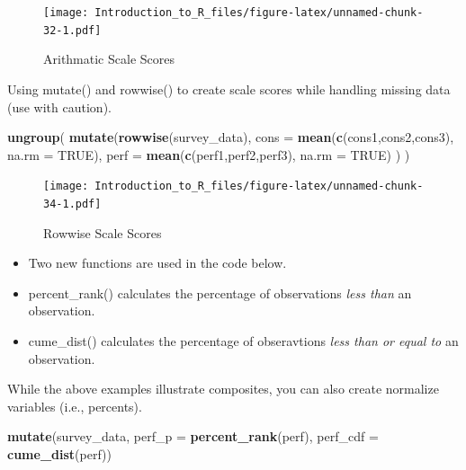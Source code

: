 \documentclass[]{book}
\newenvironment{Shaded}{\begin{snugshade}}{\end{snugshade}}
\newcommand{\DataTypeTok}[1]{\textcolor[rgb]{0.13,0.29,0.53}{#1}}
\newcommand{\KeywordTok}[1]{\textcolor[rgb]{0.13,0.29,0.53}{\textbf{#1}}}
\newcommand{\NormalTok}[1]{#1}
\newcommand{\OtherTok}[1]{\textcolor[rgb]{0.56,0.35,0.01}{#1}}
\providecommand{\tightlist}{%
  \setlength{\itemsep}{0pt}\setlength{\parskip}{0pt}}
\theoremstyle{definition}
\theoremstyle{definition}
\theoremstyle{definition}
\theoremstyle{remark}
\let\BeginKnitrBlock\begin \let\EndKnitrBlock\end
\begin{document}
\begin{figure}
\centering
\texttt{[image: Introduction\_to\_R\_files/figure-latex/unnamed-chunk-32-1.pdf]}
\caption{\label{fig:unnamed-chunk-32}Arithmatic Scale Scores}
\end{figure}

\BeginKnitrBlock{example}
\protect\hypertarget{exm:mutate2}{}{\label{exm:mutate2} }Using mutate() and rowwise() to create scale scores while handling missing data (use with caution).
\EndKnitrBlock{example}

\begin{Shaded}
\begin{Highlighting}[]
\KeywordTok{ungroup}\NormalTok{(}
  \KeywordTok{mutate}\NormalTok{(}\KeywordTok{rowwise}\NormalTok{(survey_data),}
         \DataTypeTok{cons =} \KeywordTok{mean}\NormalTok{(}\KeywordTok{c}\NormalTok{(cons1,cons2,cons3),}
                     \DataTypeTok{na.rm =} \OtherTok{TRUE}\NormalTok{), }
         \DataTypeTok{perf =} \KeywordTok{mean}\NormalTok{(}\KeywordTok{c}\NormalTok{(perf1,perf2,perf3), }
                     \DataTypeTok{na.rm =} \OtherTok{TRUE}\NormalTok{)}
\NormalTok{         )}
\NormalTok{  )}
\end{Highlighting}
\end{Shaded}

\begin{figure}
\centering
\texttt{[image: Introduction\_to\_R\_files/figure-latex/unnamed-chunk-34-1.pdf]}
\caption{\label{fig:unnamed-chunk-34}Rowwise Scale Scores}
\end{figure}

\begin{itemize}
\tightlist
\item
  Two new functions are used in the code below.
\item
  percent\_rank() calculates the percentage of observations \emph{less than} an observation.
\item
  cume\_dist() calculates the percentage of obseravtions \emph{less than or equal to} an observation.
\end{itemize}

\BeginKnitrBlock{example}
\protect\hypertarget{exm:mutate3}{}{\label{exm:mutate3} }While the above examples illustrate composites, you can also create normalize variables (i.e., percents).
\EndKnitrBlock{example}

\begin{Shaded}
\begin{Highlighting}[]
\KeywordTok{mutate}\NormalTok{(survey_data, }\DataTypeTok{perf_p =} \KeywordTok{percent_rank}\NormalTok{(perf),}
       \DataTypeTok{perf_cdf =} \KeywordTok{cume_dist}\NormalTok{(perf))}
\end{Highlighting}
\end{Shaded}
\end{document}
